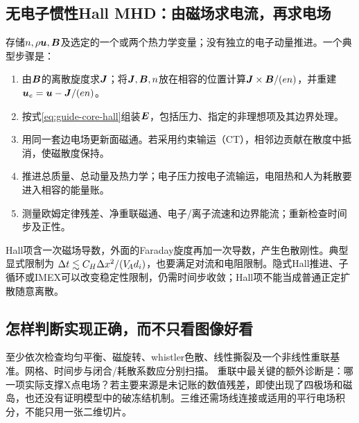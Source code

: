 \documentclass[UTF8,a4paper,11pt,openany,fontset=fandol]{ctexbook}
\begin{document}
\subsection{无电子惯性Hall MHD：由磁场求电流，再求电场}
存储$n,\rho\bm{u},\bm{B}$及选定的一个或两个热力学变量；没有独立的电子动量推进。一个典型步骤是：
\begin{enumerate}
\item 由$\bm{B}$的离散旋度求$\bm{J}$；将$\bm{J},\bm{B},n$放在相容的位置计算$\bm{J}\times\bm{B}/(en)$，并重建$\bm{u}_e=\bm{u}-\bm{J}/(en)$。
\item 按式\eqref{eq:guide-core-hall}组装$\bm{E}$，包括压力、指定的非理想项及其边界处理。
\item 用同一套边电场更新面磁通。若采用约束输运（CT），相邻边贡献在散度中抵消，使磁散度保持。
\item 推进总质量、总动量及热力学；电子压力按电子流输运，电阻热和人为耗散要进入相容的能量账。
\item 测量欧姆定律残差、净重联磁通、电子/离子流速和边界能流；重新检查时间步及正性。
\end{enumerate}
Hall项含一次磁场导数，外面的Faraday旋度再加一次导数，产生色散刚性。典型显式限制为
$\Delta t\lesssim C_H\Delta x^2/(V_{\!A} d_i)$，也要满足对流和电阻限制。隐式Hall推进、子循环或IMEX可以改变稳定性限制，仍需时间步收敛；Hall项不能当成普通正定扩散随意离散。\citep{Arnold2008,Toth2008}

\subsection{怎样判断实现正确，而不只看图像好看}
至少依次检查均匀平衡、磁旋转、whistler色散、线性撕裂及一个非线性重联基准。网格、时间步与闭合/耗散系数应分别扫描。
重联中最关键的额外诊断是：哪一项实际支撑X点电场？若主要来源是未记账的数值残差，即使出现了四极场和磁岛，也还没有证明模型中的破冻结机制。三维还需场线连接或适用的平行电场积分，不能只用一张二维切片。


\backmatter
\end{document}
